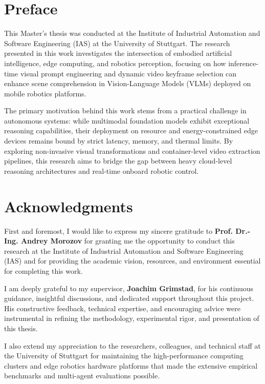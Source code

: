 \section*{Preface}

This Master's thesis was conducted at the Institute of Industrial Automation and Software Engineering (IAS) at the University of Stuttgart. The research presented in this work investigates the intersection of embodied artificial intelligence, edge computing, and robotics perception, focusing on how inference-time visual prompt engineering and dynamic video keyframe selection can enhance scene comprehension in Vision-Language Models (VLMs) deployed on mobile robotics platforms.

The primary motivation behind this work stems from a practical challenge in autonomous systems: while multimodal foundation models exhibit exceptional reasoning capabilities, their deployment on resource and energy-constrained edge devices remains bound by strict latency, memory, and thermal limits. By exploring non-invasive visual transformations and container-level video extraction pipelines, this research aims to bridge the gap between heavy cloud-level reasoning architectures and real-time onboard robotic control.

\section*{Acknowledgments}

First and foremost, I would like to express my sincere gratitude to \textbf{Prof. Dr.-Ing. Andrey Morozov} for granting me the opportunity to conduct this research at the Institute of Industrial Automation and Software Engineering (IAS) and for providing the academic vision, resources, and environment essential for completing this work. 

I am deeply grateful to my supervisor, \textbf{Joachim Grimstad}, for his continuous guidance, insightful discussions, and dedicated support throughout this project. His constructive feedback, technical expertise, and encouraging advice were instrumental in refining the methodology, experimental rigor, and presentation of this thesis.

I also extend my appreciation to the researchers, colleagues, and technical staff at the University of Stuttgart for maintaining the high-performance computing clusters and edge robotics hardware platforms that made the extensive empirical benchmarks and multi-agent evaluations possible.

